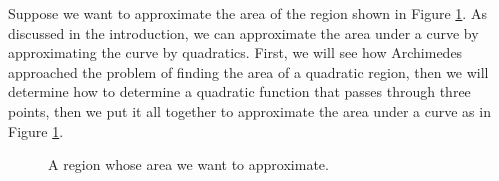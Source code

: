  \label{sec:1_b_polynomial}

Suppose we want to approximate the area of the region shown in Figure \ref{F:1_b_area}. As discussed in the introduction, we can approximate the area under a curve by approximating the curve by quadratics. First, we will see how Archimedes approached the problem of finding the area of a quadratic region, then we will determine how to determine a quadratic function that passes through three points, then we put it all together to approximate the area under a curve as in Figure \ref{F:1_b_area}. 

\begin{figure}[h]
\begin{center}
\end{center}
\caption{A region whose area we want to approximate.}
\label{F:1_b_area}
\end{figure}

